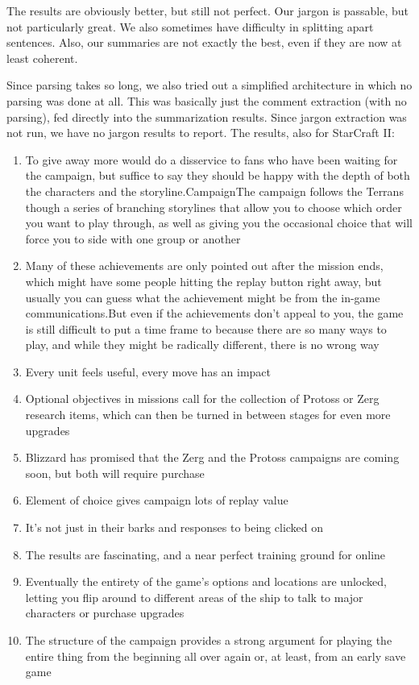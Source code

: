 \documentclass{article}
\begin{document}
The results are obviously better, but still not perfect. Our jargon is passable,
but not particularly great. We also sometimes have difficulty in splitting
apart sentences. Also, our summaries are not exactly the best, even if they
are now at least coherent.

Since parsing takes so long, we also tried out a simplified architecture in
which no parsing was done at all. This was basically just the comment extraction
(with no parsing), fed directly into the summarization results. Since jargon
extraction was not run, we have no jargon results to report.
The results, also for StarCraft II:
\begin{enumerate}
\item To give away more would do a disservice to fans who have been waiting for the campaign, but suffice to say they should be happy with the depth of both the characters and the storyline.CampaignThe campaign follows the Terrans though a series of branching storylines that allow you to choose which order you want to play through, as well as giving you the occasional choice that will force you to side with one group or another
\item Many of these achievements are only pointed out after the mission ends, which might have some people hitting the replay button right away, but usually you can guess what the achievement might be from the in-game communications.But even if the achievements don't appeal to you, the game is still difficult to put a time frame to because there are so many ways to play, and while they might be radically different, there is no wrong way
\item Every unit feels useful, every move has an impact
\item Optional objectives in missions call for the collection of Protoss or Zerg research items, which can then be turned in between stages for even more upgrades
\item Blizzard has promised that the Zerg and the Protoss campaigns are coming soon, but both will require purchase
\item Element of choice gives campaign lots of replay value
\item It's not just in their barks and responses to being clicked on
\item The results are fascinating, and a near perfect training ground for online
\item Eventually the entirety of the game's options and locations are unlocked, letting you flip around to different areas of the ship to talk to major characters or purchase upgrades
\item The structure of the campaign provides a strong argument for playing the entire thing from the beginning all over again or, at least, from an early save game
\end{enumerate}
\end{document}
